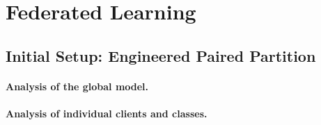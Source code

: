 \documentclass[11pt,a4paper]{report}  %
\begin{document}
\section{Federated Learning}
\label{sec:fl-results}

\subsection{Initial Setup: Engineered Paired Partition}
\label{sec:engineered-fl}


\paragraph{Analysis of the global model.}




\paragraph{Analysis of individual clients and classes.}



\end{document}
